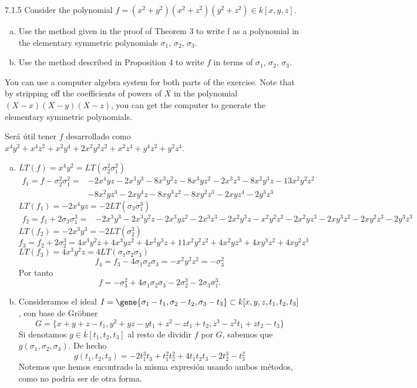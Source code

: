 \documentclass[twoside]{article}
\begin{document}
\begin{ejercicio}{7.1.5}
Consider the polynomial
$f = (x^2 + y^2)(x^2 + z^2)(y^2 + z^2) ∈ k[x, y, z]$.
\begin{enumerate}[a.]
\item Use the method given in the proof of Theorem 3 to write f as a polynomial in the
elementary symmetric polynomials $σ_1$, $σ_2$, $σ_3$.
\item Use the method described in Proposition 4 to write $f$ in terms of $σ_1$, $σ_2$, $σ_3$.
\end{enumerate}

 You can use a computer algebra system for both parts of the exercise. Note that by
stripping off the coefficients of powers of $X$ in the polynomial $(X − x)(X − y)(X − z)$,
you can get the computer to generate the elementary symmetric polynomials.
 
\end{ejercicio}
\begin{solucion}
Será útil tener $f$ desarrollado como $x^4y^2 + x^4z^2 + x^2y^4 + 2x^2y^2z^2 + x^2z^4 + y^4z^2 + y^2z^4$.
\begin{enumerate}[a.]
\item $LT(f)=x^4y^2=LT(\sigma_2^2\sigma_1^2)$
\begin{align*}
f_1=f-\sigma_2^2\sigma_1^2=&-2x^4yz - 2x^3y^3 - 8x^3y^2z - 8x^3yz^2 - 2x^3z^3 - 8x^2y^3z - 13x^2y^2z^2\\ &- 8x^2yz^3 - 2xy^4z - 8xy^3z^2 - 8xy^2z^3 - 2xyz^4 - 2y^3z^3
\end{align*}
$LT(f_1)=-2x^4yz=-2LT(\sigma_3\sigma_1^3)$
\begin{align*}
f_2=f_1+2\sigma_3\sigma_1^3=&-2x^3y^3 - 2x^3y^2z - 2x^3yz^2 - 2x^3z^3 - 2x^2y^3z - x^2y^2z^2 - 2x^2yz^3 - 2xy^3z^2 - 2xy^2z^3 - 2y^3z^3
\end{align*}
$LT(f_2)=-2x^3y^3=-2LT(\sigma_2^3)$
\[
f_3=f_2+2\sigma_2^3=4x^3y^2z + 4x^3yz^2 + 4x^2y^3z + 11x^2y^2z^2 + 4x^2yz^3 + 4xy^3z^2 + 4xy^2z^3
\]
$LT(f_3)=4x^3y^2z=4LT(\sigma_1\sigma_2\sigma_3)$
\[
f_4=f_3-4\sigma_1\sigma_2\sigma_3=-x^2y^2z^2=-\sigma_3^2
\]
Por tanto
\[
f=-\sigma_3^2+4\sigma_1\sigma_2\sigma_3-2\sigma_2^3-2\sigma_3\sigma_1^3.
\]
\item Consideramos el ideal $I=\gene{\sigma_1-t_1,\sigma_2-t_2,\sigma_3-t_3}\subset k[x,y,z,t_1,t_2,t_3]$, con base de Gröbner
\[
G=\{x + y + z - t_1, y^2 + yz - yt_1 + z^2 - zt_1 + t_2, z^3 - z^2t_1 + zt_2 - t_3\}
\]
Si denotamos $g\in k[t_1,t_2,t_3]$ al resto de dividir $f$ por $G$, sabemos que $g(\sigma_1,\sigma_2,\sigma_3)$. De hecho
$$
g(t_1,t_2,t_3)= -2t_1^3t_3 + t_1^2t_2^2 + 4t_1t_2t_3 - 2t_2^3 - t_3^2
$$
Notemos que hemos encontrado la misma expresión usando ambos métodos, como no podría ser de otra forma.
\end{enumerate}



\end{solucion}
\newpage
\end{document}
